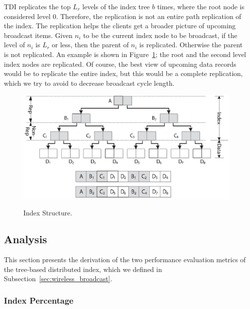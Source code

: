 TDI replicates the top $L_r$ levels of the index tree $b$ times,
where the root node is considered level 0. Therefore, the
replication is not an entire path replication of the index. The
replication helps the clients get a broader picture of upcoming
broadcast items. Given $n_i$ to be the current index node to be
broadcast, if the level of $n_i$ is $L_r$ or less, then the parent
of $n_i$ is replicated. Otherwise the parent is not replicated. An
example is shown in Figure~\ref{fig:index_struct}; the root and
the second level index nodes are replicated. Of course, the best
view of upcoming data records would be to replicate the entire
index, but this would be a complete replication, which we try to
avoid to decrease broadcast cycle length.

\begin{figure}[!h]
\begin{center}
\includegraphics[width=5in]{Figures/bcast_struct.eps}
\caption{Index Structure.} \vspace*{-10pt}
\label{fig:index_struct}
\end{center}
\end{figure}


\subsection{Analysis}

This section presents the derivation of the two performance
evaluation metrics of the tree-based distributed index, which we
defined in Subsection~\ref{sec:wireless_broadcast}.

\subsubsection{Index Percentage}

